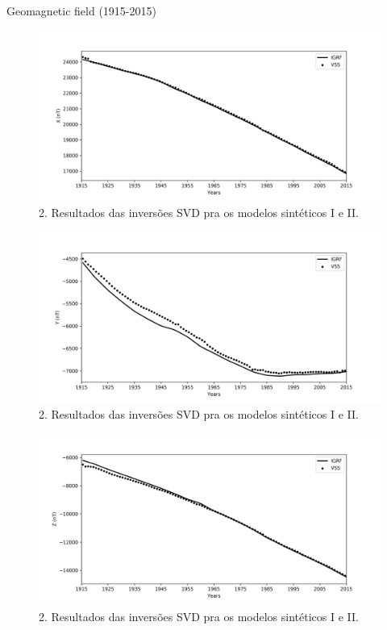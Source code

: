 \documentclass[final,t]{beamer}
\begin{document}
\begin{columns}[t]
\begin{column}{.33\linewidth}
\begin{block}{Geomagnetic field (1915-2015)}
\begin{figure}
	\centering
	\includegraphics[width=1.0\linewidth]{X}
	\caption{2. Resultados das inversões SVD pra os modelos sintéticos I e II.}
	\label{fig:g_Sintetico}
\end{figure}

\begin{figure}
	\centering
	\includegraphics[width=1.0\linewidth]{Y}
	\caption{2. Resultados das inversões SVD pra os modelos sintéticos I e II.}
	\label{fig:g_Sintetico}
\end{figure}

\begin{figure}
	\centering
	\includegraphics[width=1.0\linewidth]{Z}
	\caption{2. Resultados das inversões SVD pra os modelos sintéticos I e II.}
	\label{fig:g_Sintetico}
\end{figure}


\end{block}
\end{column}
\end{columns}
\end{document}
